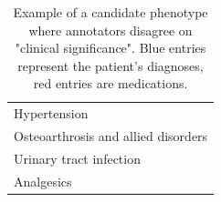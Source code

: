 \documentclass{sig-alternate-05-2015}
\begin{document}


\begin{table}
\begin{center}
\begin{tabular}{l}
\toprule
\color{blue}Hypertension \\
\color{blue}Osteoarthrosis and allied disorders \\
\color{blue}Urinary tract infection \\
\color{red}Analgesics\\
\bottomrule
\end{tabular}
\end{center}
\caption{Example of a candidate phenotype where annotators disagree on "clinical significance". Blue entries represent the patient's diagnoses, red entries are medications.}
\label{tab:pheno-example}
\end{table}
\end{document}
